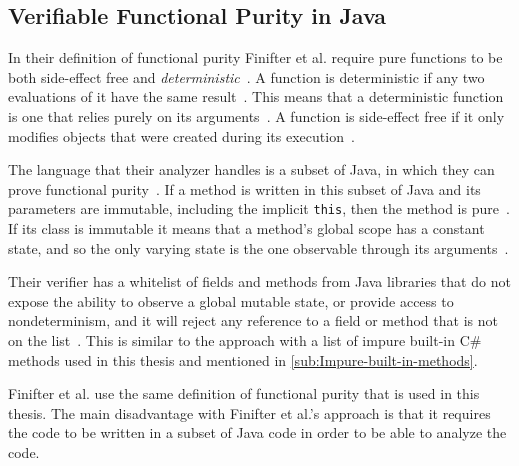 \documentclass[a4paper,12pt]{article}
\begin{document}
\subsection{Verifiable Functional Purity in Java} \label{sub:Verifiable-Functional-Purity-in-Java}
In their definition of functional purity Finifter et al. require pure functions to be both side-effect free and \textit{deterministic}~\cite{purity-in-java}. A function is deterministic if any two evaluations of it have the same result~\cite{purity-in-java}. This means that a deterministic function is one that relies purely on its arguments~\cite{purity-in-java}. A function is side-effect free if it only modifies objects that were created during its execution~\cite{purity-in-java}.

The language that their analyzer handles is a subset of Java, in which they can prove functional purity~\cite{purity-in-java}. If a method is written in this subset of Java and its parameters are immutable, including the implicit \texttt{this}, then the method is pure~\cite{purity-in-java}. %
If its class is immutable it means that a method's global scope has a constant state, and so the only varying state is the one observable through its arguments~\cite{purity-in-java}.

Their verifier has a whitelist of fields and methods from Java libraries that do not expose the ability to observe a global mutable state, or provide access to nondeterminism, and it will reject any reference to a field or method that is not on the list~\cite{purity-in-java}. This is similar to the approach with a list of impure built-in C\# methods used in this thesis and mentioned in \autoref{sub:Impure-built-in-methods}.

Finifter et al. use the same definition of functional purity that is used in this thesis. The main disadvantage with Finifter et al.'s approach is that it requires the code to be written in a subset of Java code in order to be able to analyze the code.
\end{document}
